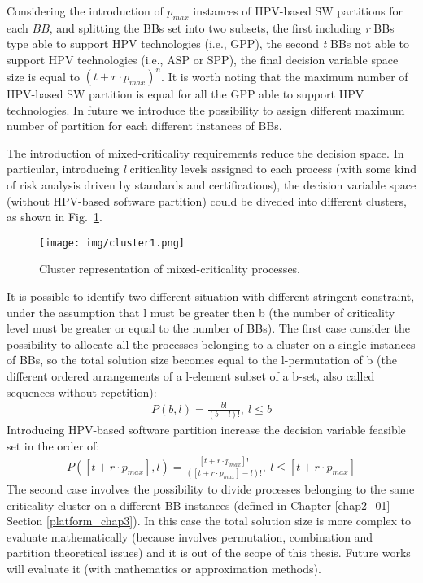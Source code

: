 Considering the introduction of \textit{$p_{max}$} instances of HPV-based SW partitions for each $BB$, and splitting the BBs set into two subsets, the first including \textit{r} BBs type able to support HPV technologies (i.e., GPP), the second \textit{t} BBs not able to support HPV technologies (i.e., ASP or SPP), the final decision variable space size is equal to $(t + r \cdot p_{max})^n$. It is worth noting that the maximum number of HPV-based SW partition is equal for all the GPP able to support HPV technologies. In future we introduce the possibility to assign different maximum number of partition for each different instances of BBs.\par
The introduction of mixed-criticality requirements reduce the decision space. In particular, introducing \textit{l} criticality levels assigned to each process (with some kind of risk analysis driven by standards and certifications), the decision variable space (without HPV-based software partition) could be diveded into different clusters, as shown in Fig.~\ref{Sol_Space_size_1}. 
%
\begin{figure}[htbp]
	\centerline{\texttt{[image: img/cluster1.png]}}
	\caption{Cluster representation of mixed-criticality processes.}
	\label{Sol_Space_size_1}
\end{figure}
%
It is possible to identify two different situation with different stringent constraint, under the assumption that l must be greater then b (the number of criticality level must be greater or equal to the number of BBs). The first case consider the possibility to allocate all the processes belonging to a cluster on a single instances of BBs, so the total solution size becomes equal to the l-permutation of b (the different ordered arrangements of a l-element subset of a b-set, also called  sequences without repetition):  
%
\begin{equation} \label{equation129}
    \begin{aligned}
    P(b,l) = \frac{b!}{(b-l)!}, \ l \leq b
    \end{aligned}
\end{equation}
%
Introducing HPV-based software partition increase the decision variable feasible set in the order of:
%
\begin{equation} \label{equation129_bis}
    \begin{aligned}
    P([t + r \cdot p_{max}],l) = \frac{[t + r \cdot p_{max}]!}{([t + r \cdot p_{max}]-l)!}, \ l \leq [t + r \cdot p_{max}]
    \end{aligned}
\end{equation}
%
The second case involves the possibility to divide processes belonging to the same criticality cluster on a different BB instances (defined in Chapter \ref{chap2_01} Section \ref{platform_chap3}). In this case the total solution size is more complex to evaluate mathematically (because involves permutation, combination and partition theoretical issues) and it is out of the scope of this thesis. Future works will evaluate it (with mathematics or approximation methods). \par
%
